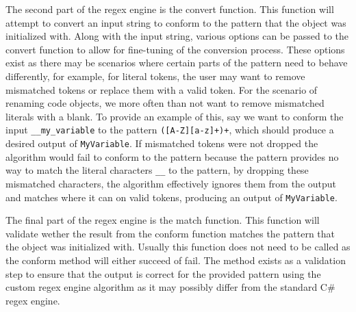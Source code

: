 The second part of the regex engine is the convert function. This function will attempt to convert an input string to conform to the pattern that the object was initialized with.
Along with the input string, various options can be passed to the convert function to allow for fine-tuning of the conversion process. These options exist as there may be scenarios where certain parts of the pattern need to behave differently, for example, for literal tokens, the user may want to remove mismatched tokens or replace them with a valid token.
For the scenario of renaming code objects, we more often than not want to remove mismatched literals with a blank. To provide an example of this, say we want to conform the input \texttt{\_\_my\_variable} to the pattern \texttt{([A-Z][a-z]+)+}, which should produce a desired output of \texttt{MyVariable}. If mismatched tokens were not dropped the algorithm would fail to conform to the pattern because the pattern provides no way to match the literal characters \texttt{\_\_} to the pattern, by dropping these mismatched characters, the algorithm effectively ignores them from the output and matches where it can on valid tokens, producing an output of \texttt{MyVariable}.

The final part of the regex engine is the match function. This function will validate wether the result from the conform function matches the pattern that the object was initialized with. Usually this function does not need to be called as the conform method will either succeed of fail. The method exists as a validation step to ensure that the output is correct for the provided pattern using the custom regex engine algorithm as it may possibly differ from the standard C\# regex engine.
